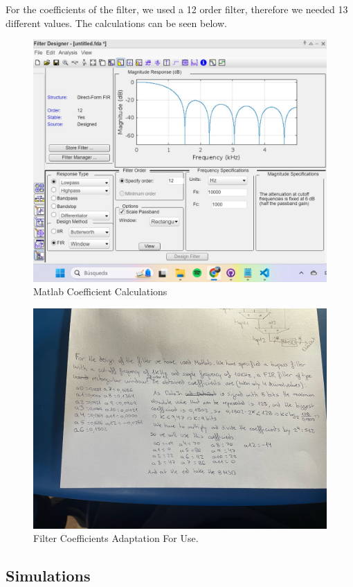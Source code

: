 \documentclass[a4paper, 12pt]{article}
\begin{document}
For the coefficients of the filter, we used a 12 order filter, therefore we needed 13 different values. The calculations can be seen below.

\begin{figure}[htbp]
\centering
\includegraphics[width=.9\linewidth]{./img/filter_coefficient_matlab.jpg}
\caption{Matlab Coefficient Calculations}
\end{figure}

\begin{figure}[htbp]
\centering
\includegraphics[width=.9\linewidth]{./img/filter_coefficient_calculations.jpg}
\caption{Filter Coefficients Adaptation For Use.}
\end{figure}
\subsection{Simulations}
\label{sec:org912ed7f}
\end{document}
